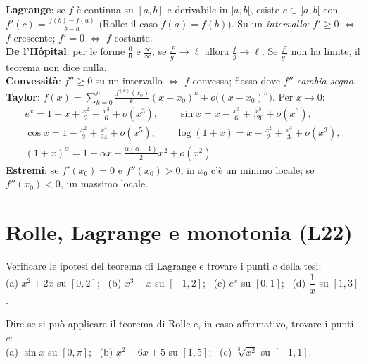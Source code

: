 \begin{vuoto}[Promemoria]{}
\textbf{Lagrange}: se $f$ è continua su $[a,b]$ e derivabile in $]a,b[$, esiste $c\in\,]a,b[$ con $f'(c)=\frac{f(b)-f(a)}{b-a}$ (Rolle: il caso $f(a)=f(b)$).
Su un \emph{intervallo}: $f'\ge0$ $\iff$ $f$ crescente; $f'=0$ $\iff$ $f$ costante.\\[2pt]
\textbf{De l'Hôpital}: per le forme $\frac00$ e $\frac\infty\infty$, se $\frac{f'}{g'}\to\ell$ allora $\frac fg\to\ell$. Se $\frac{f'}{g'}$ non ha limite, il teorema non dice nulla.\\[2pt]
\textbf{Convessità}: $f''\ge0$ su un intervallo $\iff$ $f$ convessa; flesso dove $f''$ \emph{cambia segno}.\\[2pt]
\textbf{Taylor}: $f(x)=\sum_{k=0}^n\frac{f^{(k)}(x_0)}{k!}(x-x_0)^k+o\bigl((x-x_0)^n\bigr)$. Per $x\to0$:
\begin{gather*}
e^x=1+x+\frac{x^2}2+\frac{x^3}6+o(x^3),\qquad \sin x=x-\frac{x^3}6+\frac{x^5}{120}+o(x^6),\\
\cos x=1-\frac{x^2}2+\frac{x^4}{24}+o(x^5),\qquad \log(1+x)=x-\frac{x^2}2+\frac{x^3}3+o(x^3),\\
(1+x)^\alpha=1+\alpha x+\frac{\alpha(\alpha-1)}2x^2+o(x^2).
\end{gather*}
\textbf{Estremi}: se $f'(x_0)=0$ e $f''(x_0)>0$, in $x_0$ c'è un minimo locale; se $f''(x_0)<0$, un massimo locale.
\end{vuoto}

\section{Rolle, Lagrange e monotonia (L22)}

\begin{esercizio}[\liv{1}]
Verificare le ipotesi del teorema di Lagrange e trovare i punti $c$ della tesi:\\
(a) $x^2+2x$ su $[0,2]$; \ (b) $x^3-x$ su $[-1,2]$; \ (c) $e^x$ su $[0,1]$; \ (d) $\dfrac1x$ su $[1,3]$.
\end{esercizio}
\risp{(a) $\frac{8-0}2=4=2c+2$: $c=1$. (b) $\frac{6-0}3=2=3c^2-1$: $c=\pm1$, e solo $c=1$ sta in $]-1,2[$. (c) $e^c=e-1$: $c=\log(e-1)\approx0{,}54$. (d) $\frac{\frac13-1}2=-\frac13=-\frac1{c^2}$: $c=\sqrt3$.}

\begin{esercizio}[\liv{1}]
Dire se si può applicare il teorema di Rolle e, in caso affermativo, trovare i punti $c$:\\
(a) $\sin x$ su $[0,\pi]$; \ (b) $x^2-6x+5$ su $[1,5]$; \ (c) $\sqrt[3]{x^2}$ su $[-1,1]$.
\end{esercizio}

